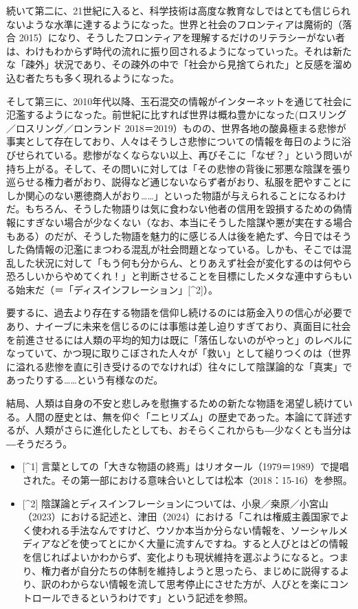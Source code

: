 続いて第二に、21世紀に入ると、科学技術は高度な教育なしではとても信じられないような水準に達するようになった。世界と社会のフロンティアは魔術的（落合
2015）\cite{Ochiai}になり、そうしたフロンティアを理解するだけのリテラシーがない者は、わけもわからず時代の流れに振り回されるようになっていった。それは新たな「疎外」状況であり、その疎外の中で「社会から見捨てられた」と反感を溜め込む者たちも多く現れるようになった。

そして第三に、2010年代以降、玉石混交の情報がインターネットを通じて社会に氾濫するようになった。前世紀に比すれば世界は概ね豊かになった(ロスリング／ロスリング／ロンランド
2018＝2019）\cite{RoslingEtAl}ものの、世界各地の酸鼻極まる悲惨が事実として存在しており、人々はそうしさ悲惨についての情報を毎日のように浴びせられている。悲惨がなくならない以上、再びそこに「なぜ？」という問いが持ち上がる。そして、その問いに対しては「その悲惨の背後に邪悪な陰謀を張り巡らせる権力者がおり、説得など通じないならず者がおり、私服を肥やすことにしか関心のない悪徳商人がおり\ldots\ldots」といった物語が与えられることになるわけだ。もちろん、そうした物語りは気に食わない他者の信用を毀損するための偽情報にすぎない場合が少なくない（なお、本当にそうした陰謀や悪が実在する場合もある）のだが、そうした物語を魅力的に感じる人は後を絶たず、今日ではそうした偽情報の氾濫にまつわる混乱が社会問題となっている。しかも、そこでは混乱した状況に対して「もう何も分からん、とりあえず社会が変化するのは何やら恐ろしいからやめてくれ！」と判断させることを目標にしたメタな連中すらもいる始末だ（＝「ディスインフレーション」{[}\^{}2{]}）。

要するに、過去より存在する物語を信仰し続けるのには筋金入りの信心が必要であり、ナイーブに未来を信じるのには事態は差し迫りすぎており、真面目に社会を前進させるには人類の平均的知力は既に「落伍しないのがやっと」のレベルになっていて、かつ現に取りこぼされた人々が「救い」として縋りつくのは（世界に溢れる悲惨を直に引き受けるのでなければ）往々にして陰謀論的な「真実」であったりする\ldots\ldots という有様なのだ。

結局、人類は自身の不安と悲しみを慰撫するための新たな物語を渇望し続けている。人間の歴史とは、無を仰ぐ「ニヒリズム」の歴史であった。本論にて詳述するが、人類がさらに進化したとしても、おそらくこれからも―少なくとも当分は―そうだろう。

\begin{itemize}
\tightlist
\item
  {[}\^{}1{]}
  言葉としての「大きな物語の終焉」はリオタール（1979＝1989）\cite{Lyotard}で提唱された。その第一部における意味合いとしては松本（2018：15-16）\cite{Matsumoto}を参照。
\item
  {[}\^{}2{]}
  陰謀論とディスインフレーションについては、小泉／桒原／小宮山（2023）\cite{KoizumiEtAl}における記述と、津田（2024）\cite{Tsuda}における「これは権威主義国家でよく使われる手法なんですけど、ウソか本当か分らない情報を、ソーシャルメディアなどを使ってとにかく大量に流すんですね。すると人びとはどの情報を信じればよいかわからず、変化よりも現状維持を選ぶようになると。つまり、権力者が自分たちの体制を維持しようと思ったら、まじめに説得するより、訳のわからない情報を流して思考停止にさせた方が、人びとを楽にコントロールできるというわけです」という記述を参照。
\end{itemize}

